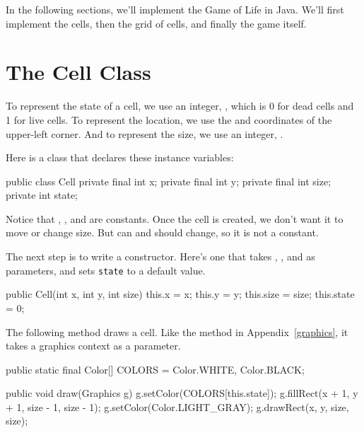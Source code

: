 In the following sections, we'll implement the Game of Life in Java.
We'll first implement the cells, then the grid of cells, and finally the game itself.


\section{The Cell Class}

To represent the state of a cell, we use an integer, , which is 0 for dead cells and 1 for live cells.
To represent the location, we use the  and  coordinates of the upper-left corner.
And to represent the size, we use an integer, .

Here is a  class that declares these instance variables:

\begin{code}
public class Cell {
    private final int x;
    private final int y;
    private final int size;
    private int state;
}
\end{code}

Notice that , , and  are constants.
Once the cell is created, we don't want it to move or change size.
But  can and should change, so it is not a constant.

The next step is to write a constructor.
Here's one that takes , , and  as parameters, and sets {\tt state} to a default value.

\begin{code}
public Cell(int x, int y, int size) {
    this.x = x;
    this.y = y;
    this.size = size;
    this.state = 0;
}
\end{code}

%

The following method draws a cell.
Like the  method in Appendix~\ref{graphics}, it takes a graphics context as a parameter.

\begin{code}
public static final Color[] COLORS = {Color.WHITE, Color.BLACK};

public void draw(Graphics g) {
    g.setColor(COLORS[this.state]);
    g.fillRect(x + 1, y + 1, size - 1, size - 1);
    g.setColor(Color.LIGHT_GRAY);
    g.drawRect(x, y, size, size);
}
\end{code}

